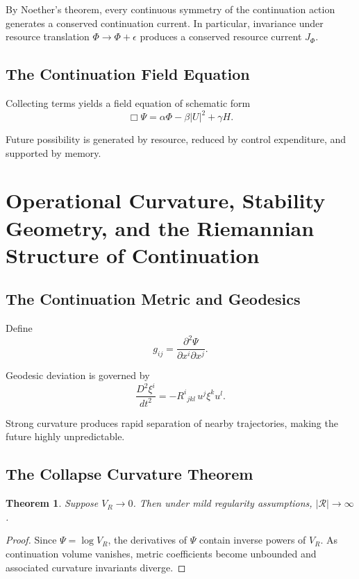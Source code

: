 \documentclass[12pt,a4paper]{article}
\newtheorem{theorem}{Theorem}[section]
\begin{document}
By Noether's theorem, every continuous symmetry of the continuation action generates a conserved continuation current. In particular, invariance under resource translation $\Phi \to \Phi + \epsilon$ produces a conserved resource current $J_\Phi$.

\subsection{The Continuation Field Equation}

Collecting terms yields a field equation of schematic form
\[
\Box\Psi = \alpha\Phi - \beta|U|^2 + \gamma H.
\]

Future possibility is generated by resource, reduced by control expenditure, and supported by memory.

\section{Operational Curvature, Stability Geometry, and the Riemannian Structure of Continuation}

\subsection{The Continuation Metric and Geodesics}

Define
\[
g_{ij} = \frac{\partial^2 \Psi}{\partial x^i \partial x^j}.
\]

Geodesic deviation is governed by
\[
\frac{D^2\xi^i}{dt^2} = -R^i{}_{jkl}\, u^j \xi^k u^l.
\]

Strong curvature produces rapid separation of nearby trajectories, making the future highly unpredictable.

\subsection{The Collapse Curvature Theorem}

\begin{theorem}
Suppose $V_R \to 0$. Then under mild regularity assumptions, $|\mathcal{R}| \to \infty$.
\end{theorem}

\begin{proof}
Since $\Psi = \log V_R$, the derivatives of $\Psi$ contain inverse powers of $V_R$. As continuation volume vanishes, metric coefficients become unbounded and associated curvature invariants diverge.
\end{proof}
\end{document}
